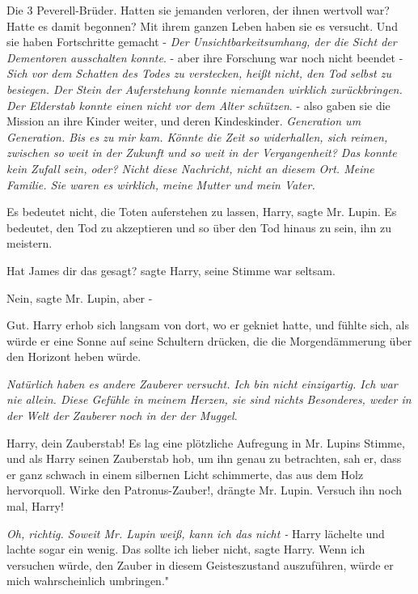 Die 3 Peverell-Brüder. Hatten sie jemanden verloren, der ihnen wertvoll war?
Hatte es damit begonnen? \glqq{}Mit ihrem ganzen Leben haben sie es versucht. Und
sie haben Fortschritte gemacht -\grqq{} \emph{Der Unsichtbarkeitsumhang, der die
Sicht der Dementoren ausschalten konnte}. \glqq{}- aber ihre Forschung war noch
nicht beendet -\grqq{} \emph{Sich vor dem Schatten des Todes zu verstecken,
heißt nicht, den Tod selbst zu besiegen. Der Stein der Auferstehung konnte
niemanden wirklich zurückbringen. Der Elderstab konnte einen nicht vor dem Alter
schützen}. \glqq{}- also gaben sie die Mission an ihre Kinder weiter, und deren
Kindeskinder.\grqq{} \emph{Generation um Generation. Bis es zu mir kam. Könnte
die Zeit so widerhallen, sich reimen, zwischen so weit in der Zukunft und so
weit in der Vergangenheit? Das konnte kein Zufall sein, oder? Nicht diese
Nachricht, nicht an diesem Ort. Meine Familie. Sie waren es wirklich, meine
Mutter und mein Vater.}

\glqq{}Es bedeutet nicht, die Toten auferstehen zu lassen, Harry\grqq{}, sagte
Mr. Lupin. \glqq{}Es bedeutet, den Tod zu akzeptieren und so über den Tod hinaus
zu sein, ihn zu meistern.\grqq{}

\glqq{}Hat James dir das gesagt?\grqq{} sagte Harry, seine Stimme war seltsam.

\glqq{}Nein\grqq{}, sagte Mr. Lupin, \glqq{}aber -\grqq{}

\glqq{}Gut.\grqq{} Harry erhob sich langsam von dort, wo er gekniet hatte, und
fühlte sich, als würde er eine Sonne auf seine Schultern drücken, die die
Morgendämmerung über den Horizont heben würde.

\emph{Natürlich haben es andere Zauberer versucht. Ich bin nicht einzigartig.
Ich war nie allein. Diese Gefühle in meinem Herzen, sie sind nichts Besonderes,
weder in der Welt der Zauberer noch in der der Muggel}.

\glqq{}Harry, dein Zauberstab!\grqq{} Es lag eine plötzliche Aufregung in Mr.
Lupins Stimme, und als Harry seinen Zauberstab hob, um ihn genau zu betrachten,
sah er, dass er ganz schwach in einem silbernen Licht schimmerte, das aus dem
Holz hervorquoll. \glqq{}Wirke den Patronus-Zauber!\grqq{}, drängte Mr. Lupin.
\glqq{}Versuch ihn noch mal, Harry!\grqq{}

\emph{Oh, richtig. Soweit Mr. Lupin weiß, kann ich das nicht -}
Harry lächelte und lachte sogar ein wenig. \glqq{}Das sollte ich lieber
nicht\grqq{}, sagte Harry. \glqq{}Wenn ich versuchen würde, den Zauber in diesem
Geisteszustand auszuführen, würde er mich wahrscheinlich umbringen."

